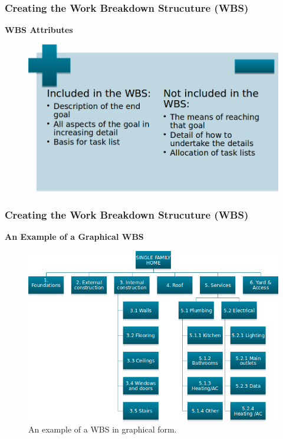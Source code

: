 \documentclass{beamer}
\begin{document}

\begin{frame}
\frametitle{Creating the Work Breakdown Strucuture (WBS)}
\textbf{WBS Attributes}
\begin{figure}
\includegraphics[scale=0.45]{wbs_att}
\end{figure}
\end{frame}


\begin{frame}
\frametitle{Creating the Work Breakdown Strucuture (WBS)}
\textbf{An Example of a Graphical WBS}
\vspace{0.5cm}
\begin{figure}
\includegraphics[scale=0.5]{wbs_graph}
\caption{An example of a WBS in graphical form.}
\end{figure}
\end{frame}
\end{document}
